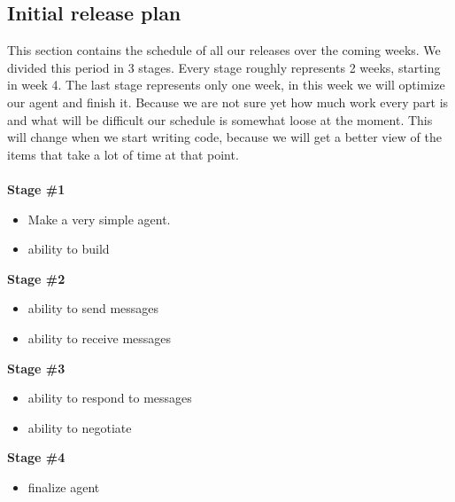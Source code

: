 \subsection{Initial release plan}

This section contains the schedule of all our releases over the coming weeks. We divided this period in 3 stages. Every stage roughly represents 2 weeks, starting in week 4. The last stage represents only one week, in this week we will optimize our agent and finish it. Because we are not sure yet how much work every part is and what will be difficult our schedule is somewhat loose at the moment. This will change when we start writing code, because we will get a better view of the items that take a lot of time at that point.\\
\\

\textbf{Stage \#1}
\begin{itemize}
\item Make a very simple agent.
\item ability to build
\end{itemize}

\textbf{Stage \#2}
\begin{itemize}
\item ability to send messages
\item ability to receive messages
\end{itemize}

\textbf{Stage \#3}
\begin{itemize}
\item ability to respond to messages
\item ability to negotiate
\end{itemize}

\textbf{Stage \#4}
\begin{itemize}
\item finalize agent
\end{itemize}
